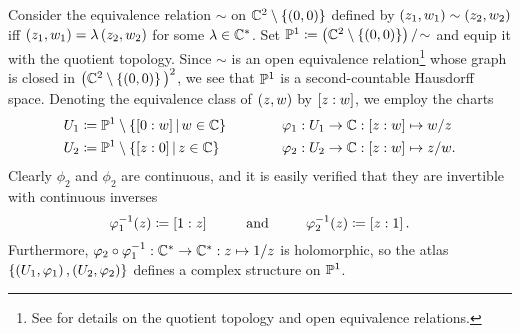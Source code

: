\documentclass[../Moduli_Spaces_of_Riemann_Surfaces.tex]{subfiles}
\begin{document}
    \begin{example}\label{RS:exa:complex_projective_line}
        Consider the equivalence relation $\sim$ on $\C^2\comp\l\{\tpl{0,0}\r\}$ defined by $\tpl{z_1,w_1}\sim\tpl{z_2,w_2}$ iff $\tpl{z_1,w_1}=\lambda\tpl{z_2,w_2}$ for some $\lambda\in\C^\ast$. Set $\P^1\coloneqq\l(\C^2\comp\l\{\tpl{0,0}\r\}\r)/\!\sim$ and equip it with the quotient topology. Since $\sim$ is an open equivalence relation\footnote{See \cite[][Section 7.5]{tu} for details on the quotient topology and open equivalence relations.} whose graph is closed in $\big(\C^2\comp\l\{\tpl{0,0}\r\}\big)^2$, we see that $\P^1$ is a second-countable Hausdorff space. Denoting the equivalence class of $\tpl{z,w}$ by $\proje{z:w}$, we employ the charts
        \begin{equation*}
            \begin{alignedat}{2}
                U_1&\coloneqq\P^1\comp\l\{\proje{0:w}\mid w\in\C\r\}\ \ \ \ \ \ \ \ \ \ \ \ &&\phi_1:U_1\to\C:\proje{z:w}\mapsto w/z \\
                U_2&\coloneqq\P^1\comp\l\{\proje{z:0}\mid z\in\C\r\}&&\phi_2:U_2\to\C:\proje{z:w}\mapsto z/w.
            \end{alignedat}
        \end{equation*}
        Clearly $\phi_2$ and $\phi_2$ are continuous, and it is easily verified that they are invertible with continuous inverses
        \begin{equation*}
            \phi_1^{-1}\!\l(z\r)\coloneqq\proje{1:z}\ \ \ \ \ \ \ \ \textrm{and}\ \ \ \ \ \ \ \ \phi_2^{-1}\!\l(z\r)\coloneqq\proje{z:1}.
        \end{equation*}
        Furthermore, $\phi_2\circ\phi_1^{-1}:\C^\ast\to\C^\ast:z\mapsto1/z$ is holomorphic, so the atlas $\l\{\tpl{U_1,\phi_1},\tpl{U_2,\phi_2}\r\}$ defines a complex structure on $\P^1$.\exqed
    \end{example}
\end{document}
